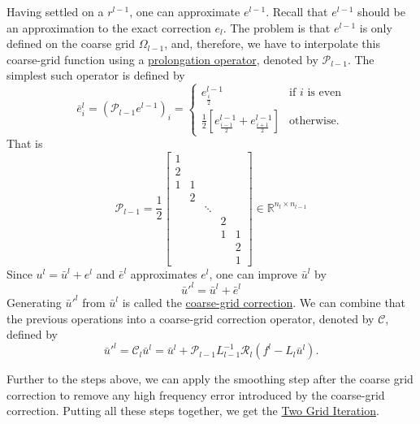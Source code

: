 \documentclass[a4paper,10pt,oneside]{book}
\theoremstyle{plain}%
\theoremstyle{definition}
\theoremstyle{remark}
\newcommand{\bbR}{\mathbb{R}}
\newcommand{\calC}{\mathcal{C}}
\newcommand{\calR}{\mathcal{R}}
\newcommand{\calP}{\mathcal{P}}
\newcommand{\fl}{f^l}
\newcommand{\bul}{\bar{u}^l}
\newcommand{\Ll}{L_l}
\begin{document}
Having settled on a $r^{l-1}$, one can approximate $e^{l-1}$. Recall that
$e^{l-1}$ should be an approximation to the exact correction $e_l$. The problem
is that $e^{l-1}$ is only defined on the coarse grid $\Omega_{l-1}$, and,
therefore, we have to interpolate this coarse-grid function using a
\underline{prolongation operator}, denoted by $\calP_{l-1}$. The simplest such
operator is defined by
\begin{equation}
 \bar{e}^l_i = (\calP_{l-1}e^{l-1})_i =
   \begin{cases}
    e^{l-1}_{\frac{i}{2}}&\text{if }i\text{ is even}\\
   
\frac{1}{2}\left[e^{l-1}_{\frac{i-1}{2}}+e^{l-1}_{\frac{i+1}{2}}\right]&\text{
otherwise.}
   \end{cases}
\end{equation}
That is
\begin{equation}
 \calP_{l-1}=\frac{1}{2}
   \begin{bmatrix}
    1 &   &   &   &   \\
    2 &   &   &   &   \\
    1 & 1 &   &   &   \\
      & 2 &   &   &   \\
      &   &\ddots&&   \\
      &   &   & 2 &   \\
      &   &   & 1 & 1 \\
      &   &   &   & 2 \\
      &   &   &   & 1
   \end{bmatrix}\in\bbR^{n_l\times n_{l-1}}
\end{equation}
Since $u^l = \bar{u}^l+e^l$ and $\bar{e}^l$ approximates $e^l$, one can improve
$\bar{u}^l$ by
\begin{equation}
 \bar{u}'^l=\bar{u}^l+\bar{e}^l
\end{equation}
Generating $\bar{u}'^l$ from $\bar{u}^l$ is called the \underline{coarse-grid
correction}. We can combine that the previous operations into a coarse-grid
correction operator, denoted by $\calC$, defined by
\begin{equation}
 \bar{u}'^l=\calC_l\bar{u}^l=\bar{u}^l+\calP_{l-1}L_{l-1}^{-1}
\calR_l(\fl-\Ll\bul).
\end{equation}

Further to the steps above, we can apply the smoothing step after the coarse
grid correction to remove any high frequency error introduced by the
coarse-grid correction. Putting all these steps together, we get the
\underline{Two Grid Iteration}.
\end{document}
